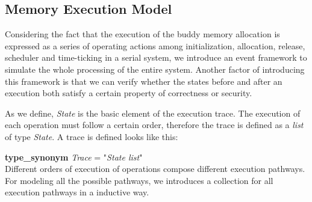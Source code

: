 \documentclass[runningheads]{llncs}
\begin{document}
\subsection{Memory Execution Model}
Considering the fact that the execution of the buddy memory allocation is expressed as a series of operating actions among initialization, allocation, release, scheduler and time-ticking in a serial system, we introduce an event framework to simulate the whole processing of the entire system. Another factor of introducing this framework is that we can verify whether the states before and after an execution both satisfy a certain property of correctness or security.

As we define, \textsl{State} is the basic element of the execution trace. The execution of each operation must follow a certain order, therefore the trace is defined as a \textsl{list} of type \textsl{State}. A trace is defined looks like this:

\phantom{x} \textbf{type\_synonym} \textsl{Trace} = "\textsl{State list}" \\

Different orders of execution of operations compose different execution pathways. For modeling all the possible pathways, we introduces a collection for all execution pathways in a inductive way.
\end{document}
